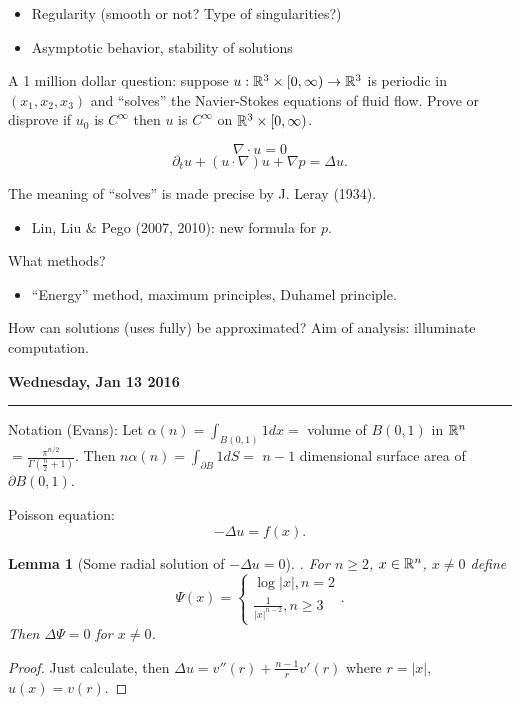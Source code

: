 \documentclass[11pt]{amsart}%
\newtheorem{lemma}[theorem]{Lemma}
\begin{document}
\begin{itemize}
\item
  Regularity (smooth or not? Type of singularities?)
\item
  Asymptotic behavior, stability of solutions
\end{itemize}

A 1 million dollar question: suppose \(u:\mathbb{R}^3\times [0,\infty)\to \mathbb{R}^3\)
is periodic in \((x_1,x_2,x_3)\) and ``solves'' the Navier-Stokes
equations of fluid flow. Prove or disprove if \(u_0\) is \(C^\infty\)
then \(u\) is \(C^\infty\) on \(\mathbb{R}^3\times[0,\infty)\).

\[\nabla\cdot u =0\]
\[\partial_t u + (u\cdot \nabla)u+\nabla p=\Delta u.\]

The meaning of ``solves'' is made precise by J. Leray (1934).

\begin{itemize}
\item
  Lin, Liu \& Pego (2007, 2010): new formula for \(p\).
\end{itemize}

What methods?

\begin{itemize}
\item
  ``Energy'' method, maximum principles, Duhamel principle.
\end{itemize}

How can solutions (uses fully) be approximated? Aim of analysis: illuminate
computation.

\newpage
\textbf{Wednesday, Jan 13 2016}

\begin{center}\rule{0.5\linewidth}{\linethickness}\end{center}

Notation (Evans): Let \(\alpha(n)=\int_{B(0,1)}1dx=\) volume of
\(B(0,1)\) in \(\mathbb{R}^n\) \(=\frac{\pi^{n/2}}{\Gamma(\frac{n}{2}+1)}\).
Then \(n\alpha(n)=\int_{\partial B}1dS=\) \(n-1\) dimensional surface
area of \(\partial B(0,1)\).

Poisson equation: \[-\Delta u=f(x).\]

\begin{lemma}[Some radial solution of \(-\Delta u =0\)]. For
\(n\ge 2\), \(x\in \mathbb{R}^n\), \(x\not=0\) define
\[{\Psi}(x)=\begin{cases} \log\vert x\vert, n=2 \\
\frac{1}{|x|^{n-2}}, n\ge 3\end{cases}.\] Then \(\Delta {\Psi}=0\) for
\(x\not=0\).
\end{lemma}
\begin{proof} Just calculate, then
\(\Delta u = v''(r)+\frac{n-1}{r}v'(r)\) where \(r=\vert x\vert\),
\(u(x)=v(r)\).
\end{proof}
\end{document}
